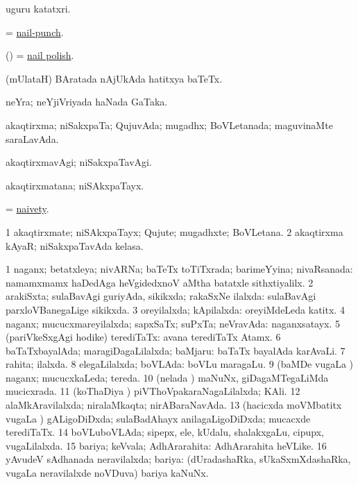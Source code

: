 \bentry
{}
\gl{\nA}
\bmng
uguru katatxri. 
\emng
\eentry

\bentry
{}
\gl{\nA}
\bmng
= \hyperlink{nail-punch}{nail-punch}.
\emng
\eentry

\bentry
{}
\gl{\nA}
\bmng
(\birx) = \hyperlink{nail polish}{nail polish}.
\emng
\eentry

\bentry
{}
\gl{\nA}
\bmng
(mUlataH) BAratada nAjUkAda hatitxya baTeTx. 
\emng
\eentry

\bentry
{}
\gl{\nA}
\bmng
neYra; neYjiVriyada haNada GaTaka. 
\emng
\eentry

\bentry
{}
\gl{\gu}
\bmng
akaqtirxma; niSakxpaTa; QujuvAda; mugadhx; BoVLetanada; maguvinaMte saraLavAda. 
\emng
\eentry

\bentry
{}
\gl{\kirxvi}
\bmng
akaqtirxmavAgi; niSakxpaTavAgi. 
\emng
\eentry

\bentry
{}
\gl{\nA}
\bmng
akaqtirxmatana; niSAkxpaTayx. 
\emng
\eentry

\bentry
{}
\gl{\nA}
\bmng
= \hyperlink{naivety}{naivety}.
\emng
\eentry

\bentry
{}
\gl{\nA}
\bmng
\bnum
\num{1} akaqtirxmate; niSAkxpaTayx; Qujute; mugadhxte; BoVLetana. 
\num{2} akaqtirxma kAyaR; niSakxpaTavAda kelasa. 
\enum
\emng
\eentry

\bentry
{}
\gl{\gu}
\bmng
\bnum
\num{1} naganx; betatxleya; nivARNa; baTeTx toTiTxrada; barimeYyina; nivaRsanada:  namamxmamx haDedAga heVgidedxnoV aMtha batatxle sithxtiyalilx. 
\num{2} arakiSxta; sulaBavAgi guriyAda, sikikxda; rakaSxNe ilalxda:  sulaBavAgi parxloVBanegaLige sikikxda. 
\num{3} oreyilalxda; kApilalxda:  oreyiMdeLeda katitx. 
\num{4} naganx; mucucxmareyilalxda; sapxSaTx; suPxTa; neVravAda:  naganxsatayx. 
\num{5} (pariVkeSxgAgi hodike) terediTaTx:  avana terediTaTx Atamx. 
\num{6} baTaTxbayalAda; maragiDagaLilalxda; baMjaru:  baTaTx bayalAda karAvaLi. 
\num{7} rahita; ilalxda. 
\num{8} elegaLilalxda; boVLAda:  boVLu maragaLu. 
\num{9} (baMDe \mo vugaLa \vi) naganx; mucucxkaLeda; tereda. 
\num{10} (nelada \vi) maNuNx, giDagaMTegaLiMda mucicxrada. 
\num{11} (koThaDiya \vi) piVThoVpakaraNagaLilalxda; KAli. 
\num{12} alaMkAravilalxda; niralaMkaqta; nirABaraNavAda. 
\num{13} (hacicxda moVMbatitx \mo vugaLa \vi) gALigoDiDxda; sulaBadAhayx anilagaLigoDiDxda; mucacxde terediTaTx. 
\num{14} boVLuboVLAda; sipepx, ele, kUdalu, shalakxgaLu, cipupx, \mo vugaLilalxda. 
\num{15} bariya; keVvala; AdhArarahita:  AdhArarahita heVLike. 
\num{16} yAvudeV sAdhanada neravilalxda; bariya:  (dUradashaRka, sUkaSxmXdashaRka, \mo vugaLa neravilalxde noVDuva) bariya kaNuNx. 
\enum
\emng
\eentry

